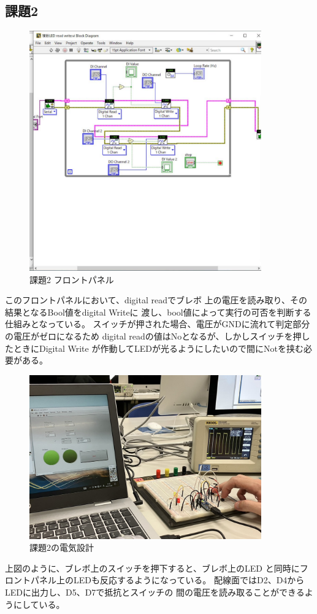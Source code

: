 \documentclass[a4paper,titlepage,11pt]{ltjsarticle}
\begin{document}
\subsection{課題2}
\begin{figure}[H]
  \begin{center}
    \includegraphics[width=100mm]{patern_b.pdf}
    \caption{課題2 フロントパネル}
  \end{center}
\end{figure}
このフロントパネルにおいて、digital readでブレボ
上の電圧を読み取り、その結果となるBool値をdigital Writeに
渡し、bool値によって実行の可否を判断する仕組みとなっている。
スイッチが押された場合、電圧がGNDに流れて判定部分の電圧がゼロになるため
digital readの値はNoとなるが、しかしスイッチを押したときにDigital Write
が作動してLEDが光るようにしたいので間にNotを挟む必要がある。
\begin{figure}[H]
  \begin{center}
    \includegraphics[width=100mm]{patern_h.pdf}
    \caption{課題2の電気設計}
  \end{center}
\end{figure}
上図のように、ブレボ上のスイッチを押下すると、ブレボ上のLED
と同時にフロントパネル上のLEDも反応するようになっている。
配線面ではD2、D4からLEDに出力し、D5、D7で抵抗とスイッチの
間の電圧を読み取ることができるようにしている。
\end{document}
